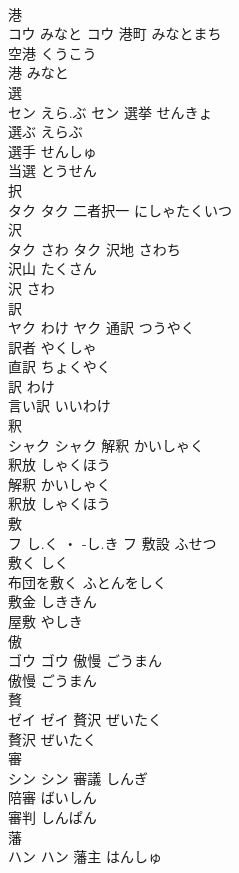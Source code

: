 \documentclass[8pt]{extreport}
\begin{document}
\begin{CJK}{UTF8}{min}
\\	港	
\\	コウ	みなと	コウ	港町	みなとまち	
\\	空港	くうこう	
\\	港	みなと	
\\	選	
\\	セン	えら.ぶ	セン	選挙	せんきょ	
\\	選ぶ	えらぶ	
\\	選手	せんしゅ	
\\	当選	とうせん	
\\	択	
\\	タク		タク													二者択一	にしゃたくいつ	
\\	沢	
\\	タク	さわ	タク	沢地	さわち	
\\	沢山	たくさん	
\\	沢	さわ	
\\	訳	
\\	ヤク	わけ	ヤク	通訳	つうやく	
\\	訳者	やくしゃ	
\\	直訳	ちょくやく	
\\	訳	わけ	
\\	言い訳	いいわけ	
\\	釈	
\\	シャク		シャク	解釈	かいしゃく	
\\	釈放	しゃくほう	
\\	解釈	かいしゃく	
\\	釈放	しゃくほう	
\\	敷	
\\	フ	し.く ・ -し.き	フ	敷設	ふせつ	
\\	敷く	しく	
\\	布団を敷く	ふとんをしく	
\\	敷金	しききん	
\\	屋敷	やしき	
\\	傲	
\\	ゴウ		ゴウ	傲慢	ごうまん	
\\	傲慢	ごうまん	
\\	贅	
\\	ゼイ		ゼイ	贅沢	ぜいたく	
\\	贅沢	ぜいたく	
\\	審	
\\	シン		シン	審議	しんぎ	
\\	陪審	ばいしん	
\\	審判	しんぱん	
\\	藩	
\\	ハン		ハン	藩主	はんしゅ	

\end{CJK}
\end{document}
